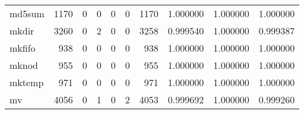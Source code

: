 \begin{longtable}{lrrrrrrrrr}
md5sum    &                                1170 &                                               0 &                                              0 &                                             0 &                                              0 &                                         1170 &                                           1.000000 &                               1.000000 &                             1.000000 \\
mkdir     &                                3260 &                                               0 &                                              2 &                                             0 &                                              0 &                                         3258 &                                           0.999540 &                               1.000000 &                             0.999387 \\
mkfifo    &                                 938 &                                               0 &                                              0 &                                             0 &                                              0 &                                          938 &                                           1.000000 &                               1.000000 &                             1.000000 \\
mknod     &                                 955 &                                               0 &                                              0 &                                             0 &                                              0 &                                          955 &                                           1.000000 &                               1.000000 &                             1.000000 \\
mktemp    &                                 971 &                                               0 &                                              0 &                                             0 &                                              0 &                                          971 &                                           1.000000 &                               1.000000 &                             1.000000 \\
mv        &                                4056 &                                               0 &                                              1 &                                             0 &                                              2 &                                         4053 &                                           0.999692 &                               1.000000 &                             0.999260 \\

\end{longtable}
